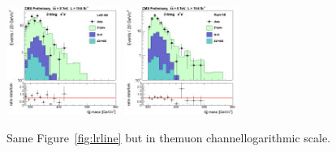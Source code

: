 \begin{figure}[htb]
{}
\centerline{
\includegraphics[width=0.33\textwidth]{plots/approvalxchecks/Left_2b_ee.png}
\includegraphics[width=0.33\textwidth]{plots/approvalxchecks/Right_2b_ee.png}
}
\caption{Same Figure~\ref{fig:lrline} but in themuon channellogarithmic scale.
\label{fig:lrloge}
}
\end{figure}

